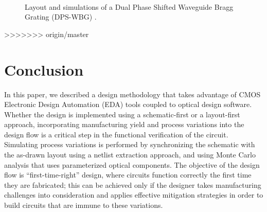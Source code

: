\documentclass[journal]{spie}
\begin{document}
\begin{figure}[tbp]
\begin{center}   
 \\
\caption{Layout and simulations of a Dual Phase Shifted Waveguide Bragg Grating (DPS-WBG) \cite{burla2013integrated}.}
\label{Bragg}
\end{center}
\end{figure}

>>>>>>> origin/master


\section{Conclusion}\label{sec6}

In this paper, we described a design methodology that takes advantage of CMOS Electronic Design Automation (EDA) tools coupled to optical design software.  Whether the design is implemented using a schematic-first or a layout-first approach, incorporating manufacturing yield and process variations into the design flow is a critical step in the functional verification of the circuit.  Simulating process variations is performed by synchronizing the schematic with the as-drawn layout using a netlist extraction approach, and using Monte Carlo analysis that uses parameterized optical components.
The  objective of the design flow is ``first-time-right'' design, where circuits function correctly the first time they are fabricated; this can be achieved only if the designer takes manufacturing challenges into consideration and applies effective mitigation strategies in order to build circuits that are immune to these variations.
\end{document}
